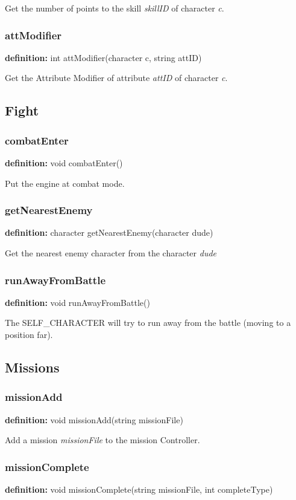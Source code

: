 \documentclass[ letterpaper,12pt]{article}
\begin{document}
Get the number of points to the skill {\it skillID} of character {\it c}.

\subsubsection{attModifier}
{\bf definition:} int attModifier(character c, string attID)

Get the Attribute Modifier of attribute {\it attID} of character {\it c}.

\subsection{Fight}

\subsubsection{combatEnter}
{\bf definition:} void combatEnter()

Put the engine at combat mode.

\subsubsection{getNearestEnemy}
{\bf definition:} character getNearestEnemy(character dude)

Get the nearest enemy character from the character {\it dude}

\subsubsection{runAwayFromBattle}
{\bf definition:} void runAwayFromBattle()

The SELF\_CHARACTER will try to run away from the battle (moving to a position
far).


\subsection{Missions}

\subsubsection{missionAdd}
{\bf definition:} void missionAdd(string missionFile)

Add a mission {\it missionFile} to the mission Controller.

\subsubsection{missionComplete}
{\bf definition:} void missionComplete(string missionFile, int completeType)
\end{document}
